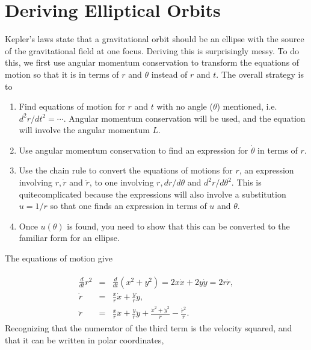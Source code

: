 \documentclass[letterpaper,10pt,english]{sphinxmanual}
\begin{document}
\section{Deriving Elliptical Orbits}
\label{\detokenize{chapter1:deriving-elliptical-orbits}}
Kepler’s laws state that a gravitational orbit should be an ellipse
with the source of the gravitational field at one focus. Deriving this
is surprisingly messy. To do this, we first use angular momentum
conservation to transform the equations of motion so that it is in
terms of \(r\) and \(\theta\) instead of \(r\) and \(t\). The overall strategy
is to
\begin{enumerate}
%
\item {} 
Find equations of motion for \(r\) and \(t\) with no angle (\(\theta\)) mentioned, i.e. \(d^2r/dt^2=\cdots\). Angular momentum conservation will be used, and the equation will involve the angular momentum \(L\).

\item {} 
Use angular momentum conservation to find an expression for \(\dot{\theta}\) in terms of \(r\).

\item {} 
Use the chain rule to convert the equations of motions for \(r\), an expression involving \(r,\dot{r}\) and \(\ddot{r}\), to one involving \(r,dr/d\theta\) and \(d^2r/d\theta^2\). This is quitecomplicated because the expressions will also involve a substitution \(u=1/r\) so that one finds an expression in terms of \(u\) and \(\theta\).

\item {} 
Once \(u(\theta)\) is found, you need to show that this can be converted to the familiar form for an ellipse.

\end{enumerate}

The equations of motion give




\begin{equation*}
\begin{split}
\begin{eqnarray}
\label{eq:radialeqofmotion} \tag{98}
\frac{d}{dt}r^2&=&\frac{d}{dt}(x^2+y^2)=2x\dot{x}+2y\dot{y}=2r\dot{r},\\
\nonumber
\dot{r}&=&\frac{x}{r}\dot{x}+\frac{y}{r}\dot{y},\\
\nonumber
\ddot{r}&=&\frac{x}{r}\ddot{x}+\frac{y}{r}\ddot{y}
+\frac{\dot{x}^2+\dot{y}^2}{r}
-\frac{\dot{r}^2}{r}.
\end{eqnarray}
\end{split}
\end{equation*}
Recognizing that the numerator of the third term is the velocity squared, and that it can be written in polar coordinates,
\end{document}
